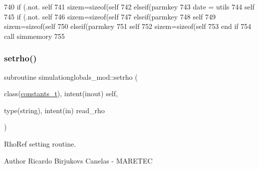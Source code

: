 \begin{DoxyCode}
740         \textcolor{keywordflow}{if} (.not. self%
741         sizem=sizeof(self%
742     \textcolor{keywordflow}{elseif}(parmkey%
743         date = utils%
744         self%
745         \textcolor{keywordflow}{if} (.not. self%
746         sizem=sizeof(self%
747     \textcolor{keywordflow}{elseif}(parmkey%
748         self%
749         sizem=sizeof(self%
750     \textcolor{keywordflow}{elseif}(parmkey%
751         self%
752         sizem=sizeof(self%
753 \textcolor{keywordflow}{    end if}
754     \textcolor{keyword}{call }simmemory%
755 
\end{DoxyCode}
\mbox{\label{namespacesimulationglobals__mod_a7d41fc05216d326ae8c0b090362430d3}} 
\subsubsection{\texorpdfstring{setrho()}{setrho()}}
{\footnotesize\ttfamily subroutine simulationglobals\+\_\+mod\+::setrho (\begin{DoxyParamCaption}\item[{class(\mbox{\hyperlink{structsimulationglobals__mod_1_1constants__t}{constants\+\_\+t}}), intent(inout)}]{self,  }\item[{type(string), intent(in)}]{read\+\_\+rho }\end{DoxyParamCaption})\hspace{0.3cm}{\ttfamily [private]}}



Rho\+Ref setting routine. 

\begin{DoxyAuthor}{Author}
Ricardo Birjukovs Canelas -\/ M\+A\+R\+E\+T\+EC 
\end{DoxyAuthor}

